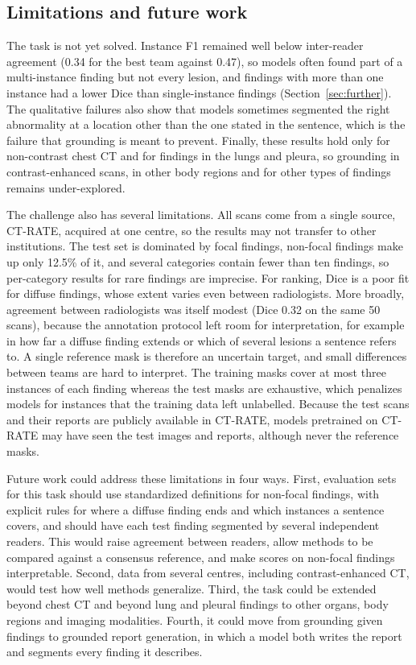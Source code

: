\documentclass[final,5p,times,twocolumn,authoryear,numafflabel]{elsarticle}
\begin{document}
\subsection{Limitations and future work}
The task is not yet solved. Instance F1 remained well below inter-reader
agreement (0.34 for the best team against 0.47), so models often
found part of a multi-instance finding but not every lesion, and findings with
more than one instance had a lower Dice than single-instance findings
(Section~\ref{sec:further}). The qualitative failures also show that models
sometimes segmented the right abnormality at a location other than the one
stated in the sentence, which is the failure that grounding is meant to prevent. Finally, these results hold only for
non-contrast chest CT and for findings in the lungs and pleura, so grounding
in contrast-enhanced scans, in other body regions and for other types of
findings remains under-explored.

The challenge also has several limitations. All scans come from a single source,
CT-RATE, acquired at one centre, so the results may not transfer to other
institutions. The test set
is dominated by focal findings, non-focal findings make up only 12.5\% of
it, and several categories contain fewer than ten findings, so per-category
results for rare findings are imprecise. For ranking, Dice is a poor fit for diffuse
findings, whose extent varies even between radiologists. More broadly, agreement between radiologists was itself
modest (Dice 0.32 on the same 50 scans), because the annotation
protocol left room for interpretation, for example in how far a diffuse finding
extends or which of several lesions a sentence refers to. A single reference
mask is therefore an uncertain target, and small differences between teams are
hard to interpret. The training masks cover at most three instances of each
finding whereas the test masks are exhaustive, which penalizes models for
instances that the training data left unlabelled. Because the test scans and
their reports are publicly available in CT-RATE, models pretrained on CT-RATE
may have seen the test images and reports, although never the reference masks.

Future work could address these limitations in four ways. First, evaluation
sets for this task should use standardized
definitions for non-focal findings, with explicit rules for where a diffuse
finding ends and which instances a sentence covers, and should have each test
finding segmented by several independent readers. This would raise agreement
between readers, allow methods to be compared against a consensus reference,
and make scores on non-focal findings interpretable.
Second, data
from several centres, including contrast-enhanced CT, would test how well
methods generalize. Third, the task could be extended beyond chest CT and
beyond lung and pleural findings to other organs, body regions and imaging
modalities. Fourth, it could move from grounding given
findings to grounded report generation, in which a model both writes the
report and segments every finding it describes.
\end{document}
